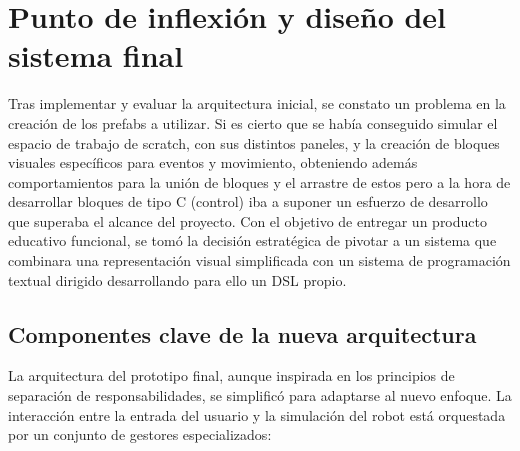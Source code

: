 \section{Punto de inflexión y diseño del sistema final}
Tras implementar y evaluar la arquitectura inicial, se constato un problema en la creación de los prefabs a utilizar. Si es cierto que se había conseguido simular el espacio de trabajo de scratch, con sus distintos paneles, y la creación de bloques visuales específicos para eventos y movimiento, obteniendo además comportamientos para la unión de bloques y el arrastre de estos pero a la hora de desarrollar bloques de tipo C (control) iba a suponer un esfuerzo de desarrollo que superaba el alcance del proyecto. Con el objetivo de entregar un producto educativo funcional, se tomó la decisión estratégica de pivotar a un sistema que combinara una representación visual simplificada con un sistema de programación textual dirigido desarrollando para ello un DSL propio.

\subsection{Componentes clave de la nueva arquitectura}
La arquitectura del prototipo final, aunque inspirada en los principios de separación de responsabilidades, se simplificó para adaptarse al nuevo enfoque. La interacción entre la entrada del usuario y la simulación del robot está orquestada por un conjunto de gestores especializados:

